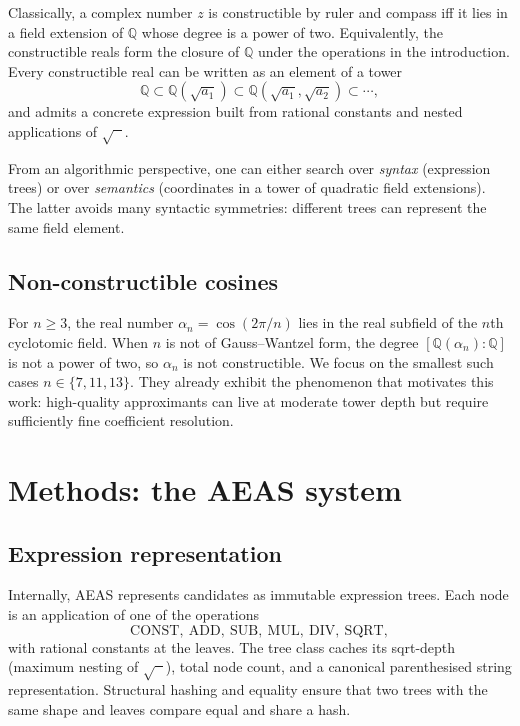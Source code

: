 \documentclass[11pt]{article}
\begin{document}
Classically, a complex number $z$ is constructible by ruler and compass iff it lies in a field extension of $\mathbb{Q}$ whose degree is a power of two.
Equivalently, the constructible reals form the closure of $\mathbb{Q}$ under the operations in the introduction.
Every constructible real can be written as an element of a tower
\[
  \mathbb{Q} \subset \mathbb{Q}(\sqrt{a_1}) \subset
  \mathbb{Q}(\sqrt{a_1},\sqrt{a_2}) \subset \cdots,
\]
and admits a concrete expression built from rational constants and nested applications of $\sqrt{\phantom{x}}$.

From an algorithmic perspective, one can either search over \emph{syntax} (expression trees) or over \emph{semantics} (coordinates in a tower of quadratic field extensions).
The latter avoids many syntactic symmetries: different trees can represent the same field element.

\subsection{Non-constructible cosines}

For $n\ge 3$, the real number $\alpha_n = \cos(2\pi/n)$ lies in the real subfield of the $n$th cyclotomic field.
When $n$ is not of Gauss--Wantzel form, the degree $[\mathbb{Q}(\alpha_n):\mathbb{Q}]$ is not a power of two, so $\alpha_n$ is not constructible.
We focus on the smallest such cases $n \in \{7,11,13\}$.
They already exhibit the phenomenon that motivates this work: high-quality approximants can live at moderate tower depth but require sufficiently fine coefficient resolution.

\section{Methods: the AEAS system}

\subsection{Expression representation}

Internally, AEAS represents candidates as immutable expression trees.
Each node is an application of one of the operations
\[
  \mathrm{CONST},\ \mathrm{ADD},\ \mathrm{SUB},\ \mathrm{MUL},\ \mathrm{DIV},\ \mathrm{SQRT},
\]
with rational constants at the leaves.
The tree class caches its sqrt-depth (maximum nesting of $\sqrt{\phantom{x}}$), total node count, and a canonical parenthesised string representation.
Structural hashing and equality ensure that two trees with the same shape and leaves compare equal and share a hash.
\end{document}
